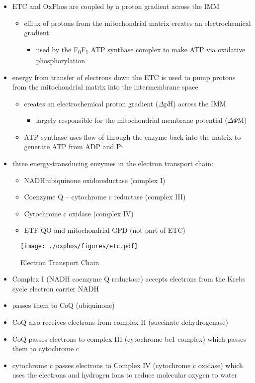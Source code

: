 \documentclass{scrartcl}
\begin{document}
\begin{itemize}
\item ETC and OxPhos are coupled by a proton gradient across the IMM
\begin{itemize}
\item efflux of protons from the mitochondrial matrix creates an
electrochemical gradient
\begin{itemize}
\item used by the F\textsubscript{0}F\textsubscript{1} ATP synthase complex to make ATP via oxidative phosphorylation
\end{itemize}
\end{itemize}
\item energy from transfer of electrons down the ETC is used to pump
protons from the mitochondrial matrix into the intermembrane space
\begin{itemize}
\item creates an electrochemical proton gradient (\(\Delta\)pH) across the IMM
\begin{itemize}
\item largely responsible for the mitochondrial membrane potential (\(\Delta \Psi\)M)
\end{itemize}
\item ATP synthase uses flow of  through the enzyme back into the
matrix to generate ATP from ADP and Pi
\end{itemize}
\item three energy-transducing enzymes in the electron transport chain:
\begin{itemize}
\item NADH:ubiquinone oxidoreductase (complex I)
\item Coenzyme Q – cytochrome c reductase (complex III)
\item Cytochrome c oxidase (complex IV)
\item ETF-QO and mitochondrial GPD (not part of ETC)
\end{itemize}
\end{itemize}

\begin{figure}[htbp]
\centering
\texttt{[image: ./oxphos/figures/etc.pdf]}
\caption{\label{fig:org3a3556d}Electron Transport Chain}
\end{figure}

\begin{itemize}
\item Complex I (NADH coenzyme Q reductase) accepts electrons from the
Krebs cycle electron carrier NADH
\item passes them to CoQ (ubiquinone)
\item CoQ also receives electrons from complex II (succinate dehydrogenase)
\item CoQ passes electrons to complex III (cytochrome bc1 complex) which
passes them to cytochrome c
\item cytochrome c passes electrons to Complex IV (cytochrome c oxidase)
which uses the electrons and hydrogen ions to reduce molecular
oxygen to water
\end{itemize}
\end{document}
